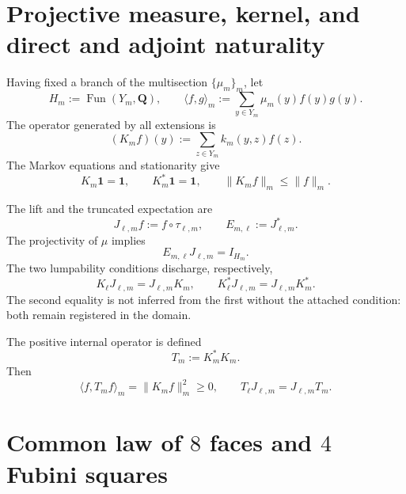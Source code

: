 \section{Projective measure, kernel, and direct and adjoint naturality}

Having fixed a branch of the multisection \(\{\mu_m\}_m\), let
\begin{equation}\label{eq:gauint-hm}
 H_m:=\operatorname{Fun}(Y_m,\mathbf Q),
 \qquad
 \langle f,g\rangle_m:=\sum_{y\in Y_m}\mu_m(y)f(y)g(y).
\end{equation}
The operator generated by all extensions is
\begin{equation}\label{eq:gauint-km}
 (K_mf)(y):=\sum_{z\in Y_m}k_m(y,z)f(z).
\end{equation}
The Markov equations and stationarity give
\begin{equation}\label{eq:gauint-markov-estacionario}
 K_m\mathbf1=\mathbf1,
 \qquad
 K_m^*\mathbf1=\mathbf1,
 \qquad
 \|K_mf\|_m\le\|f\|_m.
\end{equation}

The lift and the truncated expectation are
\begin{equation}\label{eq:gauint-lift-esperanza}
 J_{\ell,m}f:=f\circ\tau_{\ell,m},
 \qquad
 E_{m,\ell}:=J_{\ell,m}^*.
\end{equation}
The projectivity of \(\mu\) implies
\begin{equation}\label{eq:gauint-ej-identidad}
 E_{m,\ell}J_{\ell,m}=I_{H_m}.
\end{equation}
The two lumpability conditions discharge, respectively,
\begin{equation}\label{eq:gauint-naturalidad-directa-adjunta}
 K_\ell J_{\ell,m}=J_{\ell,m}K_m,
 \qquad
 K_\ell^*J_{\ell,m}=J_{\ell,m}K_m^*.
\end{equation}
The second equality is not inferred from the first without the attached condition:
both remain registered in the domain.

The positive internal operator is defined
\begin{equation}\label{eq:gauint-transferencia-t}
 T_m:=K_m^*K_m.
\end{equation}
Then
\begin{equation}\label{eq:gauint-t-positivo-natural}
 \langle f,T_mf\rangle_m=\|K_mf\|_m^2\ge0,
 \qquad
 T_\ell J_{\ell,m}=J_{\ell,m}T_m.
\end{equation}

\section{Common law of \(8\) faces and \(4\) Fubini squares}

